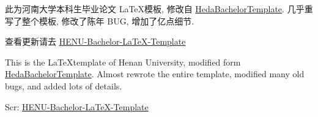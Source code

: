 \begin{cnabstract}
\thispagestyle{empty}
此为河南大学本科生毕业论文 \LaTeX 模板, 修改自 \href{https://github.com/davidgao666/HedaBachelorTemplate}{HedaBachelorTemplate}. 几乎重写了整个模板, 修改了陈年 BUG, 增加了亿点细节.

查看更新请去 \href{https://github.com/Icey-u/HENU-Bachelor-LaTeX-Template}{HENU-Bachelor-LaTeX-Template}
\end{cnabstract}
\par
\vspace*{2em} %


\cleardoublepage %


\begin{enabstract}
  This is the \LaTeX template of Henan University, modified form \href{https://github.com/davidgao666/HedaBachelorTemplate}{HedaBachelorTemplate}. Almost rewrote the entire template, modified many old bugs, and added lots of details.

  Scr: \href{https://github.com/Icey-u/HENU-Bachelor-LaTeX-Template}{HENU-Bachelor-LaTeX-Template}
\end{enabstract}
\par
\vspace*{2em}

\thispagestyle{empty}
\cleardoublepage %


